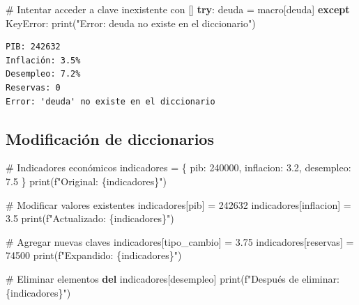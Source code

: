 \documentclass[
  doc,
  floatsintext,
  longtable,
  a4paper,
  nolmodern,
  notxfonts,
  notimes,
  12pt,
  colorlinks=true,linkcolor=blue,citecolor=blue,urlcolor=blue]{apa7}
\newenvironment{Shaded}{\begin{snugshade}}{\end{snugshade}}
\newcommand{\BuiltInTok}[1]{\textcolor[rgb]{0.00,0.23,0.31}{#1}}
\newcommand{\CommentTok}[1]{\textcolor[rgb]{0.37,0.37,0.37}{#1}}
\newcommand{\ControlFlowTok}[1]{\textcolor[rgb]{0.00,0.23,0.31}{\textbf{#1}}}
\newcommand{\DecValTok}[1]{\textcolor[rgb]{0.68,0.00,0.00}{#1}}
\newcommand{\FloatTok}[1]{\textcolor[rgb]{0.68,0.00,0.00}{#1}}
\newcommand{\KeywordTok}[1]{\textcolor[rgb]{0.00,0.23,0.31}{\textbf{#1}}}
\newcommand{\NormalTok}[1]{\textcolor[rgb]{0.00,0.23,0.31}{#1}}
\newcommand{\OperatorTok}[1]{\textcolor[rgb]{0.37,0.37,0.37}{#1}}
\newcommand{\PreprocessorTok}[1]{\textcolor[rgb]{0.68,0.00,0.00}{#1}}
\newcommand{\SpecialCharTok}[1]{\textcolor[rgb]{0.37,0.37,0.37}{#1}}
\newcommand{\SpecialStringTok}[1]{\textcolor[rgb]{0.13,0.47,0.30}{#1}}
\newcommand{\StringTok}[1]{\textcolor[rgb]{0.13,0.47,0.30}{#1}}
\begin{document}
\begin{Shaded}
\begin{Highlighting}[]
\CommentTok{\# Intentar acceder a clave inexistente con []}
\ControlFlowTok{try}\NormalTok{:}
\NormalTok{    deuda }\OperatorTok{=}\NormalTok{ macro[}\StringTok{\textquotesingle{}deuda\textquotesingle{}}\NormalTok{]}
\ControlFlowTok{except} \PreprocessorTok{KeyError}\NormalTok{:}
    \BuiltInTok{print}\NormalTok{(}\StringTok{"Error: \textquotesingle{}deuda\textquotesingle{} no existe en el diccionario"}\NormalTok{)}
\end{Highlighting}
\end{Shaded}

\begin{verbatim}
PIB: 242632
Inflación: 3.5%
Desempleo: 7.2%
Reservas: 0
Error: 'deuda' no existe en el diccionario
\end{verbatim}

\subsection{Modificación de
diccionarios}\label{modificaciuxf3n-de-diccionarios}

\begin{Shaded}
\begin{Highlighting}[]
\CommentTok{\# Indicadores económicos}
\NormalTok{indicadores }\OperatorTok{=}\NormalTok{ \{}
    \StringTok{\textquotesingle{}pib\textquotesingle{}}\NormalTok{: }\DecValTok{240000}\NormalTok{,}
    \StringTok{\textquotesingle{}inflacion\textquotesingle{}}\NormalTok{: }\FloatTok{3.2}\NormalTok{,}
    \StringTok{\textquotesingle{}desempleo\textquotesingle{}}\NormalTok{: }\FloatTok{7.5}
\NormalTok{\}}
\BuiltInTok{print}\NormalTok{(}\SpecialStringTok{f"Original: }\SpecialCharTok{\{}\NormalTok{indicadores}\SpecialCharTok{\}}\SpecialStringTok{"}\NormalTok{)}

\CommentTok{\# Modificar valores existentes}
\NormalTok{indicadores[}\StringTok{\textquotesingle{}pib\textquotesingle{}}\NormalTok{] }\OperatorTok{=} \DecValTok{242632}
\NormalTok{indicadores[}\StringTok{\textquotesingle{}inflacion\textquotesingle{}}\NormalTok{] }\OperatorTok{=} \FloatTok{3.5}
\BuiltInTok{print}\NormalTok{(}\SpecialStringTok{f"Actualizado: }\SpecialCharTok{\{}\NormalTok{indicadores}\SpecialCharTok{\}}\SpecialStringTok{"}\NormalTok{)}

\CommentTok{\# Agregar nuevas claves}
\NormalTok{indicadores[}\StringTok{\textquotesingle{}tipo\_cambio\textquotesingle{}}\NormalTok{] }\OperatorTok{=} \FloatTok{3.75}
\NormalTok{indicadores[}\StringTok{\textquotesingle{}reservas\textquotesingle{}}\NormalTok{] }\OperatorTok{=} \DecValTok{74500}
\BuiltInTok{print}\NormalTok{(}\SpecialStringTok{f"Expandido: }\SpecialCharTok{\{}\NormalTok{indicadores}\SpecialCharTok{\}}\SpecialStringTok{"}\NormalTok{)}

\CommentTok{\# Eliminar elementos}
\KeywordTok{del}\NormalTok{ indicadores[}\StringTok{\textquotesingle{}desempleo\textquotesingle{}}\NormalTok{]}
\BuiltInTok{print}\NormalTok{(}\SpecialStringTok{f"Después de eliminar: }\SpecialCharTok{\{}\NormalTok{indicadores}\SpecialCharTok{\}}\SpecialStringTok{"}\NormalTok{)}
\end{Highlighting}
\end{Shaded}
\end{document}
